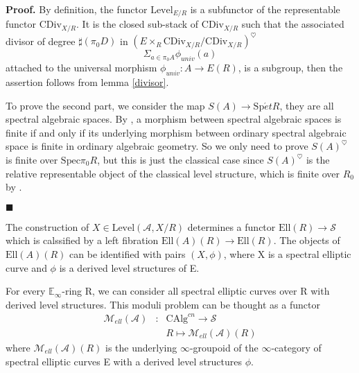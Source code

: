 \documentclass[12pt]{article}
\theoremstyle{thry}
\renewenvironment{proof}
{\par \noindent \textbf{Proof.}}
{ \par \hfill $\blacksquare$ \quad \par }
\def  \CAlg     {\mathrm{CAlg}}
\def  \CDiv     {\mathrm{CDiv}}
\def  \Ell      {\mathrm{Ell}}
\def  \Level    {\mathrm{Level}}
\def  \Spec     {\mathrm{Spec}}
\def  \Spet     {\mathrm{Sp}\acute{e}t}
\def  \ca       {\mathcal{A}}
\def  \cm       {\mathcal{M}}
\def  \cs       {\mathcal{S}}
\def  \be       {\mathbb{E}}
\begin{document}
\begin{proof}
   By definition, the functor $\Level_{E/R}$ is a subfunctor of the representable functor $\CDiv_{X/R}$. It is the closed sub-stack of $\CDiv_{X/R}$ such that the associated divisor of degree $ \sharp  (\pi_0 D)$ in $(E \times_R \CDiv_{X/R}/ \CDiv_{X/R})^{\heartsuit}$ 
   $$
   \Sigma_{a \in \pi_0 A} \phi_{univ}(a)
   $$
    attached to the universal morphism $\phi_{univ}: A \to E(R)$, is a subgroup, then the assertion follows from lemma \ref{divisor}. 
    
    To prove  the second part, we consider the map $S(A) \to \Spet R$, they are all spectral algebraic spaces. By \cite[Remark 5.2.0.2]{lu-SAG}, a morphism between spectral algebraic spaces is finite if and only if  its underlying morphism between ordinary spectral algebraic space is finite in ordinary algebraic geometry. So we only need to prove  $S(A)^{\heartsuit}$ is finite over $\Spec \pi_0 R$, but this is just the classical case since $S(A)^{\heartsuit}$ is the relative representable object of the classical level structure, which is finite over $R_0$ by \cite[Corollary 1.6.3]{katz1985arithmetic}.
\end{proof}




The construction of $X \in \Level(\ca, X/R)$ determines a functor $\Ell(R) \to \cs$ which is calssified by a left fibration $\Ell(A)(R) \to \Ell(R)$. The objects of $\Ell(A)(R)$ can be identified with pairs $(X, \phi)$, where X is a spectral elliptic curve and $\phi$ is a derived level structures of E.

For every $\be_{\infty}$-ring R, we can consider all spectral elliptic curves  over R with derived level structures. This moduli problem can be thought as a functor
\begin{eqnarray*}
	\cm_{ell}(\ca) & : &\CAlg^{cn} \to    \cs  \\	                       
	&  & R  \longmapsto     \cm_{ell}(\ca)(R)   
\end{eqnarray*}
where $ \cm_{ell}(\ca)(R)$ is the underlying $\infty$-groupoid of the $\infty$-category of spectral elliptic curves E with a derived level structures $\phi$. 
\end{document}
